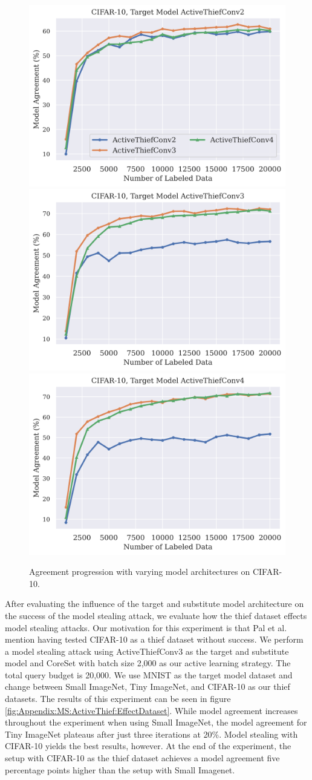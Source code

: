 \begin{figure}[!htb]
    \centering
    \includegraphics[width=0.32\linewidth]{images/MSInsights/cifar_act2.png} \hfill
    \includegraphics[width=0.32\linewidth]{images/MSInsights/cifar_act3.png} \hfill
    \includegraphics[width=0.32\linewidth]{images/MSInsights/cifar_act4.png}
    \caption{Agreement progression with varying model architectures on CIFAR-10.}
    \label{fig:CIFAR10modelComp}
\end{figure}


After evaluating the influence of the target and substitute model architecture on the success of the model stealing attack, we evaluate how the thief dataset effects
model stealing attacks. Our motivation for this experiment is that Pal et al. mention having tested CIFAR-10 as a thief dataset without success. We perform a model
stealing attack using ActiveThiefConv3 as the target and substitute model and CoreSet with batch size 2,000 as our active learning strategy. The total query budget is
20,000. We use MNIST as the target model dataset and change between Small ImageNet, Tiny ImageNet, and CIFAR-10 as our thief datasets. The results of this experiment
can be seen in figure \ref{fig:Appendix:MS:ActiveThief:EffectDataset}. While model agreement increases throughout the experiment when using Small ImageNet, the model
agreement for Tiny ImageNet plateaus after just three iterations at 20\%. Model stealing with CIFAR-10 yields the best results, however. At the end of the experiment,
the setup with CIFAR-10 as the thief dataset achieves a model agreement five percentage points higher than the setup with Small Imagenet. \par

